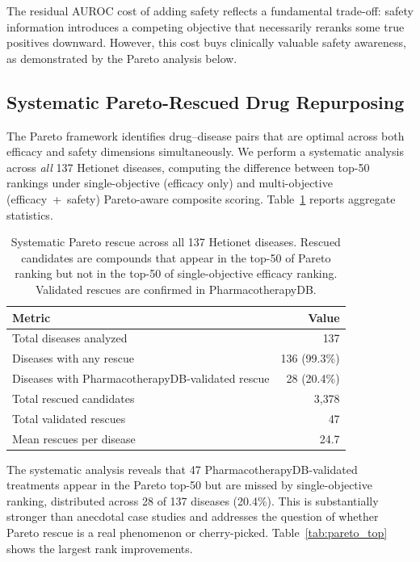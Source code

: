\documentclass[11pt,a4paper]{article}
\begin{document}
The residual AUROC cost of adding safety reflects a
fundamental trade-off: safety information introduces a competing
objective that necessarily reranks some true positives downward.
However, this cost buys clinically valuable safety awareness, as
demonstrated by the Pareto analysis below.

\subsection{Systematic Pareto-Rescued Drug Repurposing}
\label{sec:results:pareto}

The Pareto framework identifies drug--disease pairs that are optimal
across both efficacy and safety dimensions simultaneously. We perform
a systematic analysis across \emph{all} 137 Hetionet diseases, computing
the difference between top-50 rankings under single-objective (efficacy
only) and multi-objective (efficacy~+~safety) Pareto-aware composite
scoring. Table~\ref{tab:pareto_summary} reports aggregate statistics.

\begin{table}[t]
\centering
\caption{Systematic Pareto rescue across all 137 Hetionet diseases.
Rescued candidates are compounds that appear in the top-50 of Pareto
ranking but not in the top-50 of single-objective efficacy ranking.
Validated rescues are confirmed in PharmacotherapyDB.}
\label{tab:pareto_summary}
\begin{tabular}{lr}
\toprule
\textbf{Metric} & \textbf{Value} \\
\midrule
Total diseases analyzed                 & 137 \\
Diseases with any rescue                & 136 (99.3\%) \\
Diseases with PharmacotherapyDB-validated rescue & 28 (20.4\%) \\
Total rescued candidates                & 3{,}378 \\
Total validated rescues                 & 47 \\
Mean rescues per disease                & 24.7 \\
\bottomrule
\end{tabular}
\end{table}

The systematic analysis reveals that 47 PharmacotherapyDB-validated
treatments appear in the Pareto top-50 but are missed by single-objective
ranking, distributed across 28 of 137 diseases (20.4\%). This is
substantially stronger than anecdotal case studies and addresses the
question of whether Pareto rescue is a real phenomenon or cherry-picked.
Table~\ref{tab:pareto_top} shows the largest rank improvements.
\end{document}
